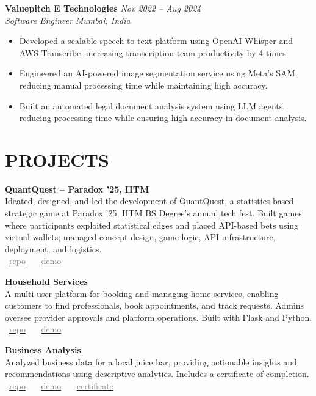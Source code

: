 \documentclass[11pt,a4paper]{article}
\begin{document}
\textbf{Valuepitch E Technologies} \hfill \textit{Nov 2022 -- Aug 2024} \\
\textit{Software Engineer} \hfill \textit{Mumbai, India} \begin{itemize}[leftmargin=*]
    \item Developed a scalable speech-to-text platform using OpenAI Whisper and AWS Transcribe, increasing transcription team productivity by 4 times.
    \item Engineered an AI-powered image segmentation service using Meta's SAM, reducing manual processing time while maintaining high accuracy.
    \item Built an automated legal document analysis system using LLM agents, reducing processing time while ensuring high accuracy in document analysis.
\end{itemize}

\section*{PROJECTS}

\textbf{QuantQuest – Paradox ’25, IITM} \\
Ideated, designed, and led the development of QuantQuest, a statistics-based strategic game at Paradox ’25, IITM BS Degree's annual tech fest. Built games where participants exploited statistical edges and placed API-based bets using virtual wallets; managed concept design, game logic, API infrastructure, deployment, and logistics. \\
\faGithub~\href{https://github.com/21f1006194/quant-quest}{\textcolor{gray}{repo}} \, \textbar{} \,
\faPlayCircle~\href{https://youtu.be/zgA83sge67Y?t=1211}{\textcolor{gray}{demo}} 

\textbf{Household Services} \\
A multi-user platform for booking and managing home services, enabling customers to find professionals, book appointments, and track requests. Admins oversee provider approvals and platform operations. Built with Flask and Python. \\
\faGithub~\href{https://github.com/21f1006194/Household-Services}{\textcolor{gray}{repo}} \, \textbar{} \,
\faPlayCircle~\href{https://www.youtube.com/watch?v=FHMdtaLWznI}{\textcolor{gray}{demo}} 

\pagebreak

\textbf{Business Analysis} \\
Analyzed business data for a local juice bar, providing actionable insights and recommendations using descriptive analytics. Includes a certificate of completion. \\
\faGithub~\href{https://github.com/jishnujp/avocado-analysis}{\textcolor{gray}{repo}} \, \textbar{} \,
\faPlayCircle~\href{https://www.youtube.com/watch?v=u5RuEhBsXKg}{\textcolor{gray}{demo}} \, \textbar{} \,
\faFilePdfO~\href{https://raw.githubusercontent.com/jishnujp/avocado-analysis/main/public/certificate.pdf}{\textcolor{gray}{certificate}} 
\end{document}
